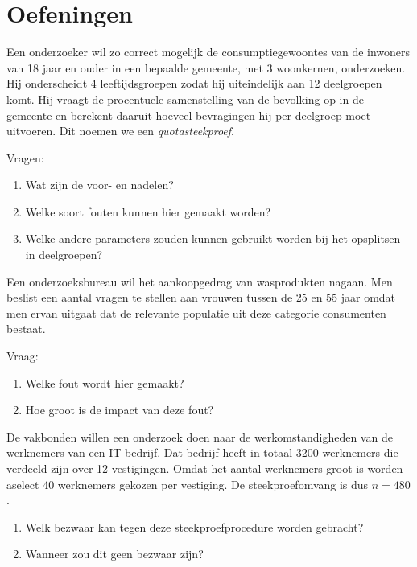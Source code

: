 {\section{Oefeningen}
\label{sec:steekproefonderzoek-oefeningen}

\begin{exercise}
  Een onderzoeker wil zo correct mogelijk de consumptiegewoontes van de inwoners van 18 jaar en ouder in een bepaalde gemeente, met 3 woonkernen, onderzoeken.  Hij onderscheidt 4 leeftijdsgroepen zodat hij uiteindelijk aan 12 deelgroepen komt. Hij vraagt de procentuele samenstelling van de bevolking op in de gemeente en berekent daaruit hoeveel bevragingen hij per deelgroep moet uitvoeren.  Dit noemen we een \emph{quotasteekproef}.
  
  Vragen:
  \begin{enumerate}[label=\alph*.]
    \item Wat zijn de voor- en nadelen?
    \item Welke soort fouten kunnen hier gemaakt worden?
    \item Welke andere parameters zouden kunnen gebruikt worden bij het opsplitsen in deelgroepen?
  \end{enumerate}
\end{exercise}

\begin{exercise}
  Een onderzoeksbureau wil het aankoopgedrag van wasprodukten nagaan. Men beslist een aantal vragen te stellen aan vrouwen tussen de 25 en 55 jaar omdat men ervan uitgaat dat de relevante populatie uit deze categorie consumenten bestaat. 
  
  Vraag:
  
  \begin{enumerate}[label=\alph*.]
    \item Welke fout wordt hier gemaakt? 
    \item Hoe groot is de impact van deze fout?
  \end{enumerate}
\end{exercise}

\begin{exercise}
  	De vakbonden willen een onderzoek doen naar de werkomstandigheden van de werknemers van een IT-bedrijf. Dat bedrijf heeft in totaal 3200 werknemers die verdeeld zijn over 
  12 vestigingen. Omdat het aantal werknemers groot is worden aselect 40 werknemers gekozen per vestiging. De steekproefomvang is dus $n = 480$.	
  \begin{enumerate}[label=\alph*.]
    \item Welk bezwaar kan tegen deze steekproefprocedure worden gebracht?
    \item Wanneer zou dit geen bezwaar zijn?
  \end{enumerate}
\end{exercise}

}
